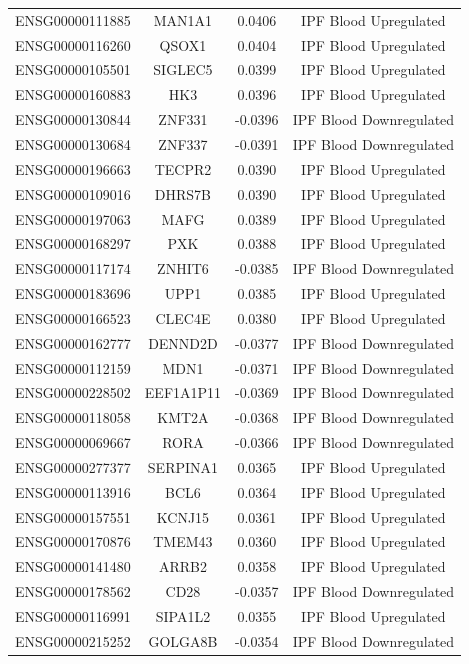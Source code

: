 \documentclass[
]{article}
\begin{document}
\begin{singlespace}
\begin{longtable}[t]{lccc}
ENSG00000111885 & MAN1A1 & 0.0406 & IPF Blood Upregulated\\
ENSG00000116260 & QSOX1 & 0.0404 & IPF Blood Upregulated\\
\addlinespace
ENSG00000105501 & SIGLEC5 & 0.0399 & IPF Blood Upregulated\\
ENSG00000160883 & HK3 & 0.0396 & IPF Blood Upregulated\\
ENSG00000130844 & ZNF331 & -0.0396 & IPF Blood Downregulated\\
ENSG00000130684 & ZNF337 & -0.0391 & IPF Blood Downregulated\\
ENSG00000196663 & TECPR2 & 0.0390 & IPF Blood Upregulated\\
\addlinespace
ENSG00000109016 & DHRS7B & 0.0390 & IPF Blood Upregulated\\
ENSG00000197063 & MAFG & 0.0389 & IPF Blood Upregulated\\
ENSG00000168297 & PXK & 0.0388 & IPF Blood Upregulated\\
ENSG00000117174 & ZNHIT6 & -0.0385 & IPF Blood Downregulated\\
ENSG00000183696 & UPP1 & 0.0385 & IPF Blood Upregulated\\
\addlinespace
ENSG00000166523 & CLEC4E & 0.0380 & IPF Blood Upregulated\\
ENSG00000162777 & DENND2D & -0.0377 & IPF Blood Downregulated\\
ENSG00000112159 & MDN1 & -0.0371 & IPF Blood Downregulated\\
ENSG00000228502 & EEF1A1P11 & -0.0369 & IPF Blood Downregulated\\
ENSG00000118058 & KMT2A & -0.0368 & IPF Blood Downregulated\\
\addlinespace
ENSG00000069667 & RORA & -0.0366 & IPF Blood Downregulated\\
ENSG00000277377 & SERPINA1 & 0.0365 & IPF Blood Upregulated\\
ENSG00000113916 & BCL6 & 0.0364 & IPF Blood Upregulated\\
ENSG00000157551 & KCNJ15 & 0.0361 & IPF Blood Upregulated\\
ENSG00000170876 & TMEM43 & 0.0360 & IPF Blood Upregulated\\
\addlinespace
ENSG00000141480 & ARRB2 & 0.0358 & IPF Blood Upregulated\\
ENSG00000178562 & CD28 & -0.0357 & IPF Blood Downregulated\\
ENSG00000116991 & SIPA1L2 & 0.0355 & IPF Blood Upregulated\\
ENSG00000215252 & GOLGA8B & -0.0354 & IPF Blood Downregulated\\

\end{longtable}
\end{singlespace}
\end{document}
